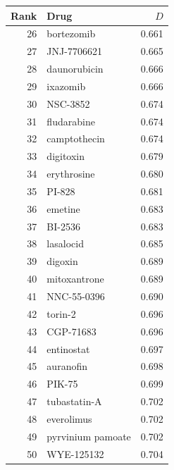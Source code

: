 \documentclass[11pt]{article}
\begin{document}
\begin{table}[h]
\hfill
\begin{minipage}[t]{0.48\textwidth}
\centering
\begin{tabular}{@{}rlr@{}}
\toprule
Rank & Drug & $D$ \\
\midrule
26 & bortezomib & 0.661 \\
27 & JNJ-7706621 & 0.665 \\
28 & daunorubicin & 0.666 \\
29 & ixazomib & 0.666 \\
30 & NSC-3852 & 0.674 \\
31 & fludarabine & 0.674 \\
32 & camptothecin & 0.674 \\
33 & digitoxin & 0.679 \\
34 & erythrosine & 0.680 \\
35 & PI-828 & 0.681 \\
36 & emetine & 0.683 \\
37 & BI-2536 & 0.683 \\
38 & lasalocid & 0.685 \\
39 & digoxin & 0.689 \\
40 & mitoxantrone & 0.689 \\
41 & NNC-55-0396 & 0.690 \\
42 & torin-2 & 0.696 \\
43 & CGP-71683 & 0.696 \\
44 & entinostat & 0.697 \\
45 & auranofin & 0.698 \\
46 & PIK-75 & 0.699 \\
47 & tubastatin-A & 0.702 \\
48 & everolimus & 0.702 \\
49 & pyrvinium pamoate & 0.702 \\
50 & WYE-125132 & 0.704 \\
\bottomrule
\end{tabular}
\end{minipage}
\end{table}
\end{document}
